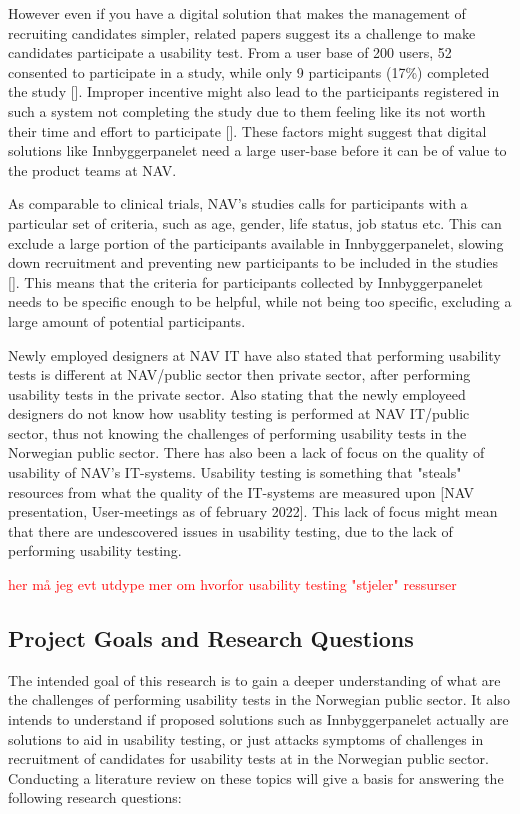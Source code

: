 However even if you have a digital solution that makes the management of recruiting candidates simpler, related papers suggest its a challenge to make candidates participate a usability test. From a user base of 200 users, 52 consented to participate in a study, while only 9 participants (17\%) completed the study [\cite{pkf_2018}]. Improper incentive might also lead to the participants registered in such a system not completing the study due to them feeling like its not worth their time and effort to participate [\cite{pkf_2018}]. These factors might suggest that digital solutions like Innbyggerpanelet need a large user-base before it can be of value to the product teams at NAV.

As comparable to clinical trials, NAV's studies calls for participants with a particular set of criteria, such as age, gender, life status, job status etc. This can exclude a large portion of the participants available in Innbyggerpanelet, slowing down recruitment and preventing new participants to be included in the studies [\cite{nc_2020}]. This means that the criteria for participants collected by Innbyggerpanelet needs to be specific enough to be helpful, while not being too specific, excluding a large amount of potential participants.

Newly employed designers at NAV IT have also stated that performing usability tests is different at NAV/public sector then private sector, after performing usability tests in the private sector. Also stating that the newly employeed designers do not know how usablity testing is performed at NAV IT/public sector, thus not knowing the challenges of performing usability tests in the Norwegian public sector. There has also been a lack of focus on the quality of usability of NAV's IT-systems. Usability testing is something that "steals" resources from what the quality of the IT-systems are measured upon [NAV presentation, User-meetings as of february 2022]. This lack of focus might mean that there are undescovered issues in usability testing, due to the lack of performing usability testing.

\textcolor{red}{her må jeg evt utdype mer om hvorfor usability testing "stjeler" ressurser}

\subsection{Project Goals and Research Questions}
The intended goal of this research is to gain a deeper understanding of what are the challenges of performing usability tests in the Norwegian public sector. It also intends to understand if proposed solutions such as Innbyggerpanelet actually are solutions to aid in usability testing, or just attacks symptoms of challenges in recruitment of candidates for usability tests at in the Norwegian public sector. Conducting a literature review on these topics will give a basis for answering the following research questions: 

